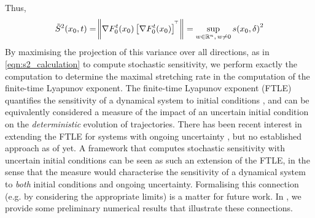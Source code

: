 Thus,
\[
	\tilde{S}^2\!\left(x_0, t\right) = \norm{\nabla F_0^t\!\left(x_0\right)\left[\nabla F_0^t\!\left(x_0\right)\right]^{^{\!\top}}} = \sup_{w \in \mathbb{R}^n, \, w \neq 0}{s\!\left(x_0, \delta\right)^2}
\]
By maximising the projection of this variance over all directions, as in \cref{eqn:s2_calculation} to compute stochastic sensitivity, we perform exactly the computation to determine the maximal stretching rate in the computation of the finite-time Lyapunov exponent.
The finite-time Lyapunov exponent (FTLE) quantifies the sensitivity of a dynamical system to initial conditions \citep{ShaddenEtAl_2005_DefinitionPropertiesLagrangian}, and can be equivalently considered a measure of the impact of an uncertain initial condition on the \emph{deterministic} evolution of trajectories.
There has been recent interest in extending the FTLE for systems with ongoing uncertainty \citep{Balasuriya_2020_UncertaintyFinitetimeLyapunov,YouLeung_2021_ComputingFiniteTime,GuoEtAl_2016_FiniteTimeLyapunovExponents}, but no established approach as of yet.
A framework that computes stochastic sensitivity with uncertain initial conditions can be seen as such an extension of the FTLE, in the sense that the measure would characterise the sensitivity of a dynamical system to \emph{both} initial conditions and ongoing uncertainty.
Formalising this connection (e.g. by considering the appropriate limits) is a matter for future work.
In , we provide some preliminary numerical results that illustrate these connections.

